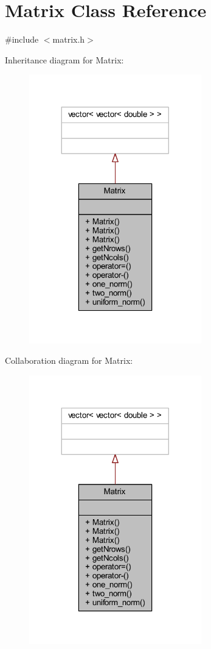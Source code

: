 \hypertarget{class_matrix}{}\section{Matrix Class Reference}
\label{class_matrix}


{\ttfamily \#include $<$matrix.\+h$>$}



Inheritance diagram for Matrix\+:\nopagebreak
\begin{figure}[H]
\begin{center}
\leavevmode
\includegraphics[width=212pt]{class_matrix__inherit__graph}
\end{center}
\end{figure}


Collaboration diagram for Matrix\+:\nopagebreak
\begin{figure}[H]
\begin{center}
\leavevmode
\includegraphics[width=212pt]{class_matrix__coll__graph}
\end{center}
\end{figure}
